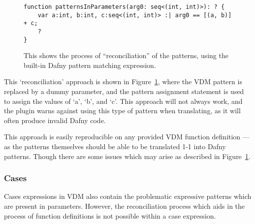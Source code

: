 \documentclass{entcs}
\newcommand{\awcomment}[1]{\ifthenelse { \boolean{showComments} } {\textcolor{blue}{AW:~#1}} { } } %
\newcommand{\lfcomment}[1]{\ifthenelse { \boolean{showComments} } {\textcolor{red}{LF:~#1}} { } } %
\begin{document}
\begin{figure}[h]
	\begin{center}
        \begin{lstlisting}
function patternsInParameters(arg0: seq<(int, int)>): ? {
    var a:int, b:int, c:seq<(int, int)> :| arg0 == [(a, b)] + c;
    ?
}
        \end{lstlisting}
		\caption{This shows the process of ``reconciliation'' of the patterns, using the built-in Dafny pattern matching expression. }\label{fig:dafny_patterning}
	\end{center}
\end{figure}


This `reconciliation' approach is shown in Figure~\ref{fig:dafny_patterning}, where the VDM pattern is replaced by a dummy parameter, and the pattern assignment statement is used to assign the values of `a', `b', and `c'. This approach will not always work, and the plugin warns against using this type of pattern when translating, as it will often produce invalid Dafny code.

This approach is easily reproducible on any provided VDM function definition --- as the patterns themselves should be able to be translated 1-1 into Dafny patterns. Though there are some issues which may arise as described in Figure~\ref{fig:dafny_patterning}.

\subsubsection{Cases}\label{section:cases}

Cases expressions in VDM also contain the problematic expressive patterns which are present in parameters. However, the reconciliation process which aids in the process of function definitions is not possible within a case expression. 
\end{document}
